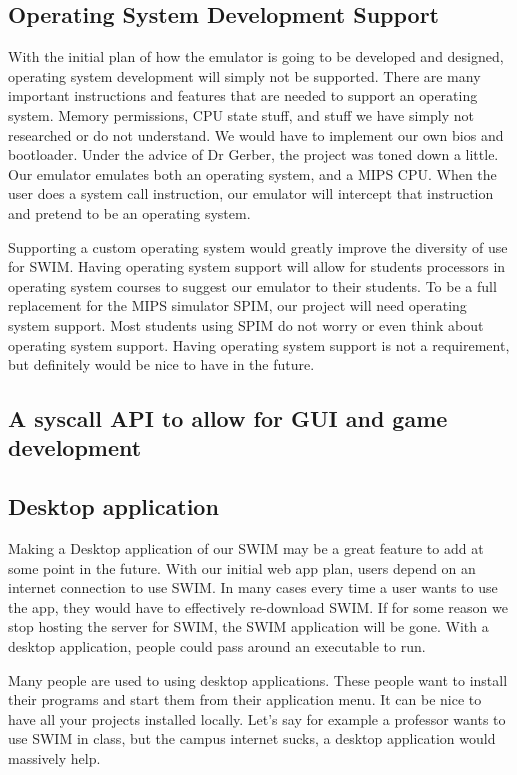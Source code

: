 \documentclass[
    parskip=half,
    fontsize=12pt,
    titlepage=firstiscover,
    toc=bibliography,
    numbers=endperiod
]{scrartcl}
\begin{document}
\subsection{Operating System Development Support}

With the initial plan of how the emulator is going to be developed and
designed, operating system development will simply not be supported.
There are many important instructions and features that are needed to
support an operating system. Memory permissions, CPU state stuff, and
stuff we have simply not researched or do not understand. We would have
to implement our own bios and bootloader. Under the advice of Dr Gerber,
the project was toned down a little. Our emulator emulates both an
operating system, and a MIPS CPU. When the user does a system call
instruction, our emulator will intercept that instruction and pretend to
be an operating system.

Supporting a custom operating system would greatly improve the diversity
of use for SWIM. Having operating system support will allow for students
processors in operating system courses to suggest our emulator to their
students. To be a full replacement for the MIPS simulator SPIM, our
project will need operating system support. Most students using SPIM do
not worry or even think about operating system support. Having operating
system support is not a requirement, but definitely would be nice to
have in the future.

\subsection{A syscall API to allow for GUI and game development}

\subsection{Desktop application}

Making a Desktop application of our SWIM may be a great feature to add
at some point in the future. With our initial web app plan, users depend
on an internet connection to use SWIM. In many cases every time a user
wants to use the app, they would have to effectively re-download SWIM.
If for some reason we stop hosting the server for SWIM, the SWIM
application will be gone. With a desktop application, people could pass
around an executable to run.

Many people are used to using desktop applications. These people want to
install their programs and start them from their application menu. It
can be nice to have all your projects installed locally. Let's say for
example a professor wants to use SWIM in class, but the campus internet
sucks, a desktop application would massively help.
\end{document}
